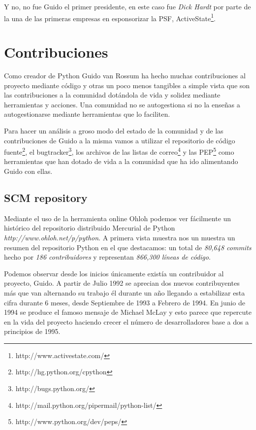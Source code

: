 \documentclass[11pt]{scrartcl}
\begin{document}
Y no, no fue Guido el primer presidente, en este caso fue \emph{Dick Hardt} por parte de la una de las primeras empresas en esponsorizar la PSF, ActiveState\footnote{http://www.activestate.com/}.

\section{Contribuciones}\label{sec:contributions}

Como creador de Python Guido van Rossum ha hecho muchas contribuciones al proyecto mediante código y otras un poco menos tangibles a simple vista que son las contribuciones a la comunidad dotándola de vida y solidez mediante herramientas y acciones. Una comunidad no se autogestiona si no la enseñas a autogestionarse mediante herramientas que lo faciliten.

Para hacer un análisis a groso modo del estado de la comunidad y de las contribuciones de Guido a la misma vamos a utilizar el repositorio de código fuente\footnote{http://hg.python.org/cpython}, el bugtracker\footnote{http://bugs.python.org/}, los archivos de las listas de correo\footnote{http://mail.python.org/pipermail/python-list/} y las PEP\footnote{http://www.python.org/dev/peps/} como herramientas que han dotado de vida a la comunidad que ha ido alimentando Guido con ellas.

\subsection{SCM repository}\label{sec:scm}

Mediante el uso de la herramienta online Ohloh podemos ver fácilmente un histórico del repositorio distribuido Mercurial de Python \emph{http://www.ohloh.net/p/python}. A primera vista muestra nos un muestra un resumen del repositorio Python en el que destacamos: un total de \emph{80,648 commits} hecho por \emph{186 contribuidores} y representan \emph{866,300 líneas de código}.

Podemos observar desde los inicios únicamente existía un contribuidor al proyecto, Guido. A partir de Julio 1992 se aprecian dos nuevos contribuyentes más que van alternando su trabajo él durante un año llegando a estabilizar esta cifra durante 6 meses, desde Septiembre de 1993 a Febrero de 1994. En junio de 1994 se produce el famoso mensaje de Michael McLay y esto parece que repercute en la vida del proyecto haciendo crecer el número de desarrolladores base a dos a principios de 1995. 
\end{document}
